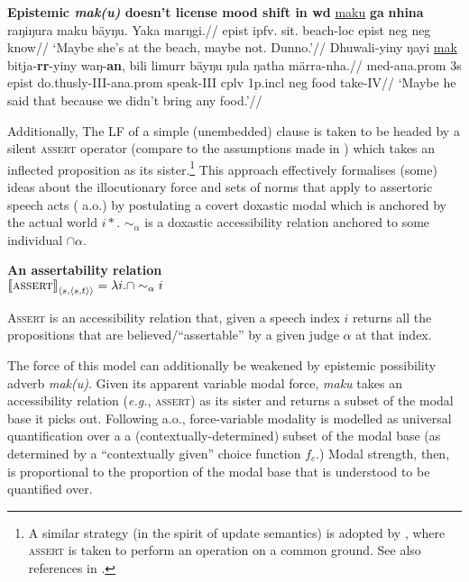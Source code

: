 	\pex\textbf{Epistemic \textit{mak(u)} doesn't license mood shift in \gls{wd}}
	\a\begingl
	\gla \ul{maku} \textbf{ga} \textbf{nhina} raŋiŋura maku bäyŋu. Yaka marŋgi.//
	\glb \gls{epist} \gls{ipfv}.\I{} sit.\I{} beach-\gls{loc} \gls{epist} \gls{neg} \gls{neg} know//
	\glft`Maybe she's at the beach, maybe not. Dunno.'\trailingcitation{[DB~20191416]}//\endgl
	\a\begingl\gla Dhuwali-yiny ŋayi \ul{mak} bitja-\textbf{rr}-yiny waŋ-\textbf{an}, bili limurr bäyŋu ŋula ŋatha märra-nha.//
	\glb \gls{med}-\gls{ana}.\gls{prom} 3s \gls{epist} do.thusly-\gls{III}-\gls{ana}.\gls{prom} speak-\gls{III} \gls{cplv} 1p.\gls{incl} \gls{neg} food take-\gls{IV}//
	\glft`Maybe he said that because we didn't bring any food.'\trailingcitation{[\citetalias[Mathyu~16:7]{DB}]}//\endgl
	\xe
	
	
	Additionally, The LF of a simple (unembedded) clause is taken to be headed by a silent \textsc{assert} operator (compare to the assumptions made in \citealt{Hacquard2010,AlonsoBenito2015,Kaufmann2005}) which takes an inflected proposition as its sister.\footnote{A similar strategy (in the spirit of update semantics) is adopted by \citet[570]{Krifka2016}, where \textsc{assert} is taken to perform an operation on a common ground. See also references in \citet[102]{Hacquard2010}.} This approach effectively formalises (some) ideas about the illocutionary force and sets of norms that apply to assertoric speech acts (\citealp[e.g.][]{Williamson1996,Brandom1983} a.o.) by postulating a covert doxastic modal which is anchored by the actual world $ i* $. $ \sim_\alpha $ is a doxastic accessibility relation anchored to some individual $\cap\alpha $.
	
	\pex \textbf{An assertability relation}\\
	$ \llbracket{\textsc{assert}}\rrbracket^{}_{\langle s,\langle s,t\rangle\rangle}
	=\lambda i.\cap\sim_\alpha i $
	
	\textsc{\textsc{Assert}} is an accessibility relation that, given a speech index $ i $ returns all the propositions that are believed/``assertable'' by a given judge $ \alpha $ at that index.
	\xe%
	
	The force of this model can additionally be weakened by epistemic possibility adverb \textit{mak(u)}. Given its apparent variable modal force, \textit{maku} takes an accessibility relation (\textit{e.g.}, \textsc{assert}) as its sister and returns a subset of the modal base it picks out.  Following \citealt{Matthewson2010,Rullmann2008} a.o., force-variable modality is modelled as universal quantification over a a (contextually-determined) subset of the modal base (as determined by a ``contextually given'' choice function $ f_c $.) Modal strength, then, is proportional to the proportion of the modal base that is understood to be quantified over.
	
